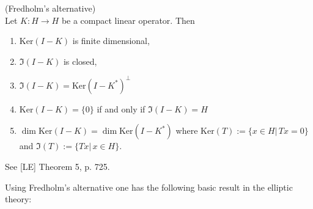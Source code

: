 \documentclass[11pt]{article}
\begin{document}
            \begin{thm}(Fredholm's alternative)\\ Let \(K: H \rightarrow H\) be a compact
                linear operator. Then
                \begin{enumerate}
                    \item \(\mathrm{Ker}(I-K)\) is finite dimensional,
                    \item \(\Im(I-K)\) is closed,
                    \item \(\Im(I-K)=\mathrm{Ker}\left(I-K^{*}\right)^{\perp}\)
                    \item \(\mathrm{Ker}(I-K)=\{0\}\) if and only if \(\Im(I-K)=H\)
                    \item \(\operatorname{dim} \mathrm{Ker}(I-K)=\operatorname{dim} \mathrm{Ker}\left(I-K^{*}\right)\)
                    where $\mathrm{Ker}(T):=\{x\in H|\, Tx=0\}$ and $\Im(T):=\{Tx| \, x\in H\}.$
                \end{enumerate}
            \end{thm}
            \begin{pproof}
                See [LE] Theorem 5, p. 725. 
            \end{pproof}
            
            Using Fredholm's alternative one has the following basic result in the elliptic theory:
            
\end{document}
